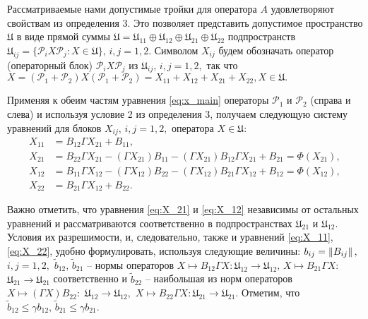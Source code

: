 Рассматриваемые нами допустимые тройки для оператора $A$ удовлетворяют свойствам из определения 3. Это позволяет представить допустимое пространство $\mathfrak{U}$ в виде прямой суммы $\mathfrak{U} = \mathfrak{U}_{11} \oplus \mathfrak{U}_{12} \oplus \mathfrak{U}_{21} \oplus \mathfrak{U}_{22}$ подпространств $\mathfrak{U}_{ij} = \{ \mathcal{P}_i X \mathcal{P}_j \colon X \in \mathfrak{U} \}, \, i,j = 1,2.$ Символом $X_{ij}$ будем обозначать оператор (операторный блок) $\mathcal{P}_i X \mathcal{P}_j$ из $\mathfrak{U}_{ij}, \, i,j = 1,2,$ так что $X = (\mathcal{P}_1 + \mathcal{P}_2) X (\mathcal{P}_1 + \mathcal{P}_2) = X_{11} + X_{12} + X_{21} + X_{22}, X \in \mathfrak{U}.$

Применяя к обеим частям уравнения \eqref{eq:x_main} операторы $\mathcal{P}_1$ и $\mathcal{P}_2$ (справа и слева) и используя условие 2 из определения 3, получаем следующую систему уравнений для блоков $X_{ij}, \, i,j = 1,2,$ оператора $X \in \mathfrak{U}:$
\begin{align}
X_{11} &= B_{12}\Gamma X_{21} + B_{11},  \label{eq:X_11} \\
X_{21} &= B_{22}\Gamma X_{21} - (\Gamma X_{21})B_{11} - (\Gamma X_{21})B_{12}\Gamma X_{21} + B_{21} = \Phi(X_{21}),  \label{eq:X_21} \\
X_{12} &= B_{11}\Gamma X_{12} - (\Gamma X_{12})B_{22} - (\Gamma X_{12})B_{21}\Gamma X_{12} + B_{12} = \Phi(X_{12}), \label{eq:X_12} \\
X_{22} &= B_{21}\Gamma X_{12} + B_{22}. \label{eq:X_22}
\end{align}

Важно отметить, что уравнения \eqref{eq:X_21} и \eqref{eq:X_12} независимы от остальных уравнений и рассматриваются  соответственно в подпространствах $\mathfrak{U}_{21}$ и $\mathfrak{U}_{12}.$ Условия их разрешимости, и, следовательно, также и уравнений \eqref{eq:X_11}, \eqref{eq:X_22}, удобно формулировать, используя следующие величины: $b_{ij} = \left\|B_{ij}\right\|, \,$ ${i,j = 1,2,}$ $\tilde{b}_{12}, \, \tilde{b}_{21}$ -- нормы операторов $X \mapsto B_{12}\Gamma X \colon \mathfrak{U}_{12} \to \mathfrak{U}_{12}, \, X \mapsto B_{21}\Gamma X \colon$\! ${\mathfrak{U}_{21} \to \mathfrak{U}_{21}}$ соответственно и $\tilde{b}_{22}$ -- наибольшая из норм операторов $X \mapsto (\Gamma X)B_{22} \colon$ ${\mathfrak{U}_{12} \to \mathfrak{U}_{12},}$ $X \mapsto B_{22}\Gamma X \colon \mathfrak{U}_{21} \to \mathfrak{U}_{21}.$ Отметим, что $\tilde{b}_{12} \leqslant \gamma b_{12}, \, \tilde{b}_{21} \leqslant \gamma b_{21}.$

